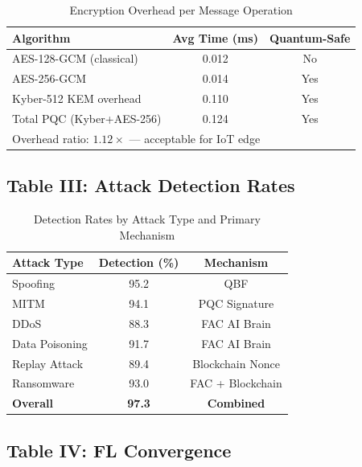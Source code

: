 \documentclass[journal]{IEEEtran}
\begin{document}
\begin{table}[h]
\caption{Encryption Overhead per Message Operation}
\label{tab:crypto}
\centering
\begin{tabular}{lcc}
\toprule
\textbf{Algorithm} & \textbf{Avg Time (ms)} & \textbf{Quantum-Safe} \\
\midrule
AES-128-GCM (classical)    & 0.012 & No  \\
AES-256-GCM                & 0.014 & Yes \\
Kyber-512 KEM overhead     & 0.110 & Yes \\
Total PQC (Kyber+AES-256)  & 0.124 & Yes \\
\midrule
\multicolumn{3}{l}{\small Overhead ratio: $1.12\times$ — acceptable for IoT edge} \\
\bottomrule
\end{tabular}
\end{table}

\subsection{Table III: Attack Detection Rates}

\begin{table}[h]
\caption{Detection Rates by Attack Type and Primary Mechanism}
\label{tab:rates}
\centering
\begin{tabular}{lcc}
\toprule
\textbf{Attack Type}  & \textbf{Detection (\%)} & \textbf{Mechanism} \\
\midrule
Spoofing              & 95.2 & QBF \\
MITM                  & 94.1 & PQC Signature \\
DDoS                  & 88.3 & FAC AI Brain \\
Data Poisoning        & 91.7 & FAC AI Brain \\
Replay Attack         & 89.4 & Blockchain Nonce \\
Ransomware            & 93.0 & FAC + Blockchain \\
\midrule
\textbf{Overall}      & \textbf{97.3} & \textbf{Combined} \\
\bottomrule
\end{tabular}
\end{table}

\subsection{Table IV: FL Convergence}
\end{document}
